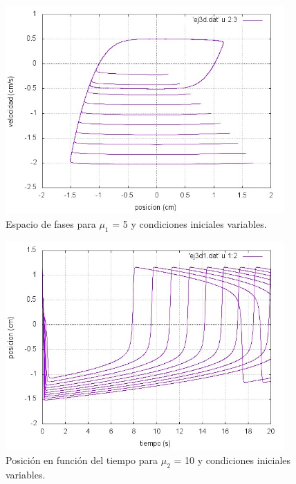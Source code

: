 \documentclass[a4paper,12pt]{article}
\begin{document}
\begin{itemize}
\begin{figure}[H]
\begin{center}
\includegraphics[height=8cm]{grafico_ej3d_xVSv.jpg}
\caption[width=5cm]{Espacio de fases para $\mu_1$ = 5 y condiciones iniciales variables.}
\end{center}
\end{figure}

\begin{figure}[H]
\begin{center}
\includegraphics[height=8cm]{grafico_ej3d1_xVSt.jpg}
\caption[width=5cm]{Posici\'on en funci\'on del tiempo para $\mu_2$ = 10 y condiciones iniciales variables.}
\end{center}
\end{figure}


\end{itemize}
\end{document}
